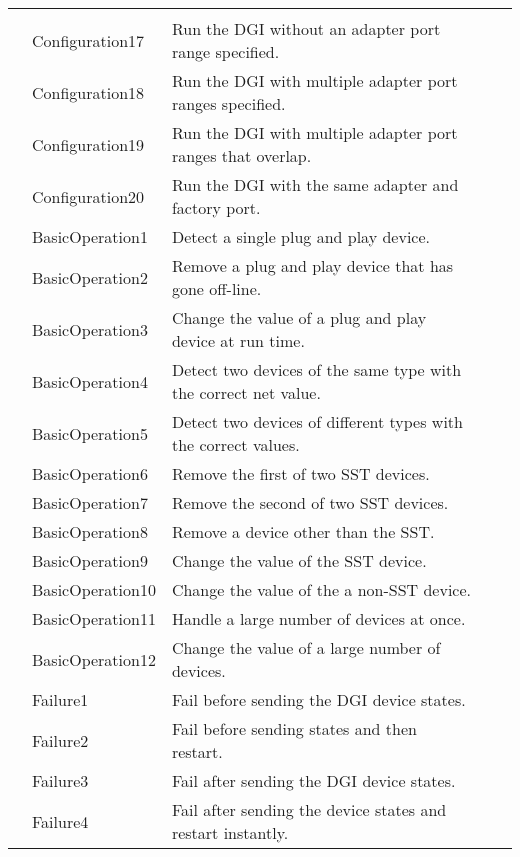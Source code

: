 \documentclass{article}
\newcounter{rownum}
\newcommand\rownumber{\stepcounter{rownum}\arabic{rownum}}
\begin{document}
\begin{longtable}{|c|p{4cm}|p{5cm}|c|p{6cm}|}
						 & & \\
	\rownumber & Configuration17 & Run the DGI without an adapter port range specified.
						 & & \\
	\rownumber & Configuration18 & Run the DGI with multiple adapter port ranges specified.
						 & & \\
	\rownumber & Configuration19 & Run the DGI with multiple adapter port ranges that overlap.
						 & & \\
	\rownumber & Configuration20 & Run the DGI with the same adapter and factory port.
						 & & \\
	\rownumber & BasicOperation1 & Detect a single plug and play device.
						 & & \\
	\rownumber & BasicOperation2 & Remove a plug and play device that has gone off-line.
						 & & \\
	\rownumber & BasicOperation3 & Change the value of a plug and play device at run time.
						 & & \\
	\rownumber & BasicOperation4 & Detect two devices of the same type with the correct net value.
						 & & \\
	\rownumber & BasicOperation5 & Detect two devices of different types with the correct values.
						 & & \\
	\rownumber & BasicOperation6 & Remove the first of two SST devices.
						 & & \\
	\rownumber & BasicOperation7 & Remove the second of two SST devices.
						 & & \\
	\rownumber & BasicOperation8 & Remove a device other than the SST.
						 & & \\
	\rownumber & BasicOperation9 & Change the value of the SST device.
						 & & \\
	\rownumber & BasicOperation10 & Change the value of the a non-SST device.
						 & & \\
	\rownumber & BasicOperation11 & Handle a large number of devices at once.
						 & & \\
 	\rownumber & BasicOperation12 & Change the value of a large number of devices.
 						 & & \\
 	\rownumber & Failure1 & Fail before sending the DGI device states.
 						 & & \\
 	\rownumber & Failure2 & Fail before sending states and then restart.
 						 & & \\
 	\rownumber & Failure3 & Fail after sending the DGI device states.
 						 & & \\
 	\rownumber & Failure4 & Fail after sending the device states and restart instantly.

\end{longtable}
\end{document}
